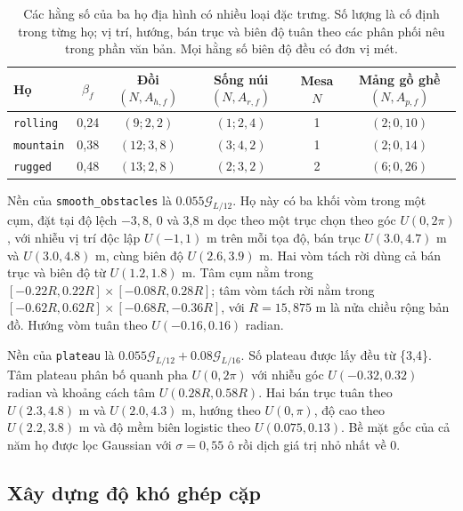 \documentclass[11pt]{article}
\begin{document}
\begin{table}[htbp]
  \centering
  \caption{Các hằng số của ba họ địa hình có nhiều loại đặc trưng. Số lượng là cố
  định trong từng họ; vị trí, hướng, bán trục và biên độ tuân theo các phân phối
  nêu trong phần văn bản. Mọi hằng số biên độ đều có đơn vị mét.}
  \label{tab:family-parameters}
  \footnotesize
  \begin{tabular}{lccccc}
    \toprule
    Họ & $\beta_f$ & \shortstack{Đồi\\$(N,A_{h,f})$} &
    \shortstack{Sống núi\\$(N,A_{r,f})$} & \shortstack{Mesa\\$N$} &
    \shortstack{Mảng gồ ghề\\$(N,A_{p,f})$} \\
    \midrule
    \texttt{rolling}  & 0,24 & $(9;2{,}2)$  & $(1;2{,}4)$ & 1 & $(2;0{,}10)$ \\
    \texttt{mountain} & 0,38 & $(12;3{,}8)$ & $(3;4{,}2)$ & 1 & $(2;0{,}14)$ \\
    \texttt{rugged}   & 0,48 & $(13;2{,}8)$ & $(2;3{,}2)$ & 2 & $(6;0{,}26)$ \\
    \bottomrule
  \end{tabular}
\end{table}

Nền của \texttt{smooth\_obstacles} là $0.055\mathcal{G}_{L/12}$. Họ này có
ba khối vòm trong một cụm, đặt tại độ lệch $-3{,}8$, 0 và 3,8 m dọc theo một trục
chọn theo góc $U(0,2\pi)$, với nhiễu vị trí độc lập $U(-1,1)$ m trên mỗi tọa
độ, bán trục $U(3.0,4.7)$ m và
$U(3.0,4.8)$ m, cùng biên độ $U(2.6,3.9)$ m. Hai vòm tách rời dùng cả bán trục
và biên độ từ $U(1.2,1.8)$ m. Tâm cụm nằm trong
$[-0.22R,0.22R]\times[-0.08R,0.28R]$; tâm vòm tách rời nằm trong
$[-0.62R,0.62R]\times[-0.68R,-0.36R]$, với $R=15{,}875$ m là nửa chiều rộng
bản đồ. Hướng vòm tuân theo $U(-0.16,0.16)$ radian.

Nền của \texttt{plateau} là
$0.055\mathcal{G}_{L/12}+0.08\mathcal{G}_{L/16}$. Số plateau được lấy đều từ
\{3,4\}. Tâm plateau phân bố quanh pha $U(0,2\pi)$ với nhiễu góc
$U(-0.32,0.32)$ radian và khoảng cách tâm $U(0.28R,0.58R)$. Hai bán trục tuân
theo $U(2.3,4.8)$ m và $U(2.0,4.3)$ m, hướng theo $U(0,\pi)$, độ cao theo
$U(2.2,3.8)$ m và độ mềm biên logistic theo $U(0.075,0.13)$. Bề mặt gốc của cả
năm họ được lọc Gaussian với $\sigma=0{,}55$ ô rồi dịch giá trị nhỏ nhất về 0.

\subsection{Xây dựng độ khó ghép cặp}
\end{document}
